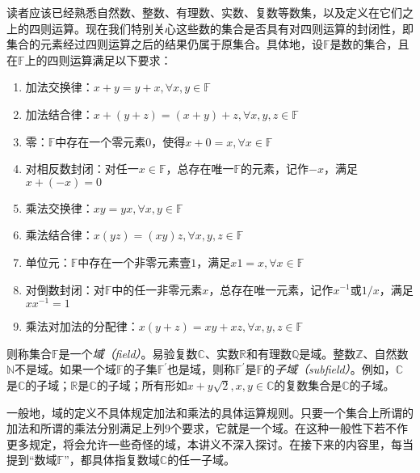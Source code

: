 \documentclass[../main.tex]{subfiles}
\begin{document}

读者应该已经熟悉自然数、整数、有理数、实数、复数等数集，以及定义在它们之上的四则运算。现在我们特别关心这些数的集合是否具有对四则运算的封闭性，即集合的元素经过四则运算之后的结果仍属于原集合。具体地，设$\mathbb{F}$是数的集合，且在$\mathbb{F}$上的四则运算满足以下要求：
\begin{enumerate}
    \item 加法交换律：$x+y=y+x,\forall x,y\in\mathbb{F}$
    \item 加法结合律：$x+\left(y+z\right)=\left(x+y\right)+z,\forall x,y,z\in\mathbb{F}$
    \item 零：$\mathbb{F}$中存在一个零元素$0$，使得$x+0=x,\forall x\in\mathbb{F}$
    \item 对相反数封闭：对任一$x\in\mathbb{F}$，总存在唯一$\mathbb{F}$的元素，记作$-x$，满足$x+\left(-x\right)=0$
    \item 乘法交换律：$xy=yx,\forall x,y\in\mathbb{F}$
    \item 乘法结合律：$x\left(yz\right)=\left(xy\right)z,\forall x,y,z\in\mathbb{F}$
    \item 单位元：$\mathbb{F}$中存在一个非零元素壹$1$，满足$x1=x,\forall x\in\mathbb{F}$
    \item 对倒数封闭：对$\mathbb{F}$中的任一非零元素$x$，总存在唯一元素，记作$x^{-1}$或$1/x$，满足$xx^{-1}=1$
    \item 乘法对加法的分配律：$x\left(y+z\right)=xy+xz,\forall x,y,z\in\mathbb{F}$
\end{enumerate}
则称集合$\mathbb{F}$是一个\emph{域（field）}。易验复数$\mathbb{C}$、实数$\mathbb{R}$和有理数$\mathbb{Q}$是域。整数$\mathbb{Z}$、自然数$\mathbb{N}$不是域。如果一个域$\mathbb{F}$的子集$\mathbb{F}^\prime$也是域，则称$\mathbb{F}^\prime$是$\mathbb{F}$的\emph{子域（subfield）}。例如，$\mathbb{C}$是$\mathbb{C}$的子域；$\mathbb{R}$是$\mathbb{C}$的子域；所有形如$x+y\sqrt{2},x,y\in\mathbb{C}$的复数集合是$\mathbb{C}$的子域。

一般地，域的定义不具体规定加法和乘法的具体运算规则。只要一个集合上所谓的加法和所谓的乘法分别满足上列9个要求，它就是一个域。在这种一般性下若不作更多规定，将会允许一些奇怪的域，本讲义不深入探讨。在接下来的内容里，每当提到“数域$\mathbb{F}$”，都具体指复数域$\mathbb{C}$的任一子域。
\end{document}
